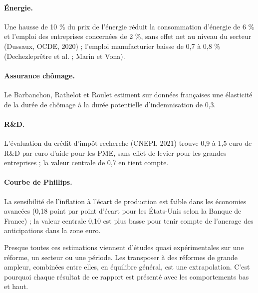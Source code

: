\paragraph{Énergie.} Une hausse de 10 \% du prix de l'énergie réduit la consommation d'énergie de 6 \% et l'emploi
des entreprises concernées de 2 \%, sans effet net au niveau du secteur (Dussaux, OCDE, 2020) ; l'emploi
manufacturier baisse de 0,7 à 0,8 \% (Dechezleprêtre et al. ; Marin et Vona).

\paragraph{Assurance chômage.} Le Barbanchon, Rathelot et Roulet estiment sur données françaises une élasticité de la
durée de chômage à la durée potentielle d'indemnisation de 0,3.

\paragraph{R\&D.} L'évaluation du crédit d'impôt recherche (CNEPI, 2021) trouve 0,9 à 1,5 euro de R\&D par euro
d'aide pour les PME, sans effet de levier pour les grandes entreprises ; la valeur centrale de 0,7 en tient compte.

\paragraph{Courbe de Phillips.} La sensibilité de l'inflation à l'écart de production est faible dans les économies
avancées (0,18 point par point d'écart pour les États-Unis selon la Banque de France) ; la valeur centrale 0,10 est
plus basse pour tenir compte de l'ancrage des anticipations dans la zone euro.

\begin{limites}
Presque toutes ces estimations viennent d'études quasi expérimentales sur une réforme, un secteur ou une période. Les
transposer à des réformes de grande ampleur, combinées entre elles, en équilibre général, est une extrapolation. C'est
pourquoi chaque résultat de ce rapport est présenté avec les comportements bas et haut.
\end{limites}
